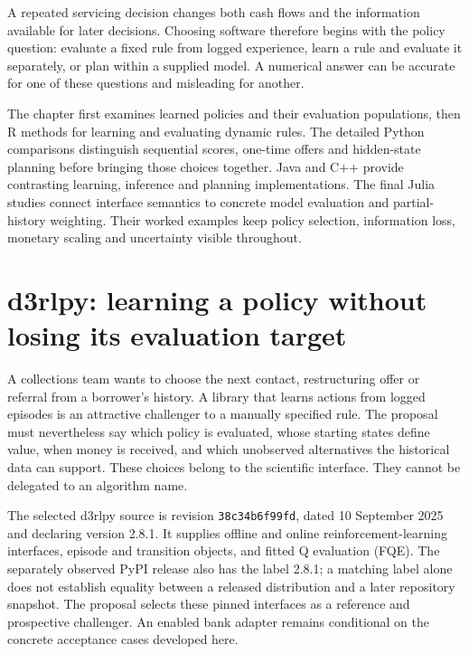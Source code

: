 A repeated servicing decision changes both cash flows and the information
available for later decisions. Choosing software therefore begins with the
policy question: evaluate a fixed rule from logged experience, learn a rule
and evaluate it separately, or plan within a supplied model. A numerical
answer can be accurate for one of these questions and misleading for another.

The chapter first examines learned policies and their evaluation populations,
then R methods for learning and evaluating dynamic rules. The detailed Python
comparisons distinguish sequential scores, one-time offers and hidden-state
planning before bringing those choices together. Java and C++ provide
contrasting learning, inference and planning implementations. The final Julia
studies connect interface semantics to concrete model evaluation and
partial-history weighting. Their worked examples keep policy selection,
information loss, monetary scaling and uncertainty visible throughout.

\section{d3rlpy: learning a policy without losing its evaluation target}
\label{exec15:d3rlpy-contract}

A collections team wants to choose the next contact, restructuring offer or
referral from a borrower's history. A library that learns actions from logged
episodes is an attractive challenger to a manually specified rule. The
proposal must nevertheless say which policy is evaluated, whose starting
states define value, when money is received, and which unobserved alternatives
the historical data can support. These choices belong to the scientific
interface. They cannot be delegated to an algorithm name.

The selected d3rlpy source is revision \texttt{38c34b6f99fd}, dated
10 September 2025 and declaring version 2.8.1. It supplies offline and online
reinforcement-learning interfaces, episode and transition objects, and fitted
Q evaluation (FQE). The separately observed PyPI release also has the label
2.8.1; a matching label alone does not establish equality between a released
distribution and a later repository snapshot. The proposal selects these
pinned interfaces as a reference and prospective challenger. An enabled bank
adapter remains conditional on the concrete acceptance cases developed here.
\citep{exec15_d3rlpy_package,exec15_d3rlpy_value,exec15_d3rlpy_contract}

